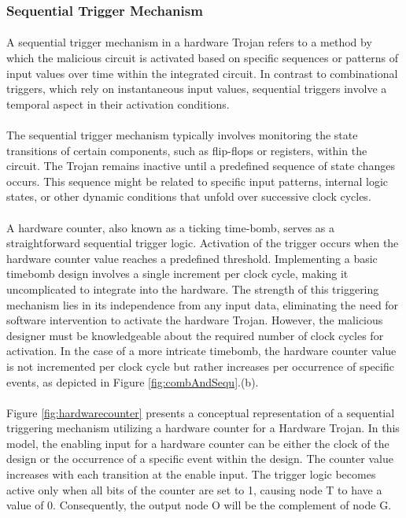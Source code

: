\subsubsection{Sequential Trigger Mechanism}
\paragraph*{}
A sequential trigger mechanism in a hardware Trojan refers to a method by which the malicious circuit is activated based on specific sequences or patterns of input values over time within the integrated circuit. In contrast to combinational triggers, which rely on instantaneous input values, sequential triggers involve a temporal aspect in their activation conditions.
\paragraph*{}
The sequential trigger mechanism typically involves monitoring the state transitions of certain components, such as flip-flops or registers, within the circuit. The Trojan remains inactive until a predefined sequence of state changes occurs. This sequence might be related to specific input patterns, internal logic states, or other dynamic conditions that unfold over successive clock cycles.
\paragraph*{}
A hardware counter, also known as a ticking time-bomb, serves as a straightforward sequential trigger logic. Activation of the trigger occurs when the hardware counter value reaches a predefined threshold. Implementing a basic timebomb design involves a single increment per clock cycle, making it uncomplicated to integrate into the hardware. The strength of this triggering mechanism lies in its independence from any input data, eliminating the need for software intervention to activate the hardware Trojan. However, the malicious designer must be knowledgeable about the required number of clock cycles for activation. In the case of a more intricate timebomb, the hardware counter value is not incremented per clock cycle but rather increases per occurrence of specific events, as depicted in Figure \ref*{fig:combAndSequ}.(b).
\paragraph*{}
Figure \ref{fig:hardwarecounter} presents a conceptual representation of a sequential triggering mechanism utilizing a hardware counter for a Hardware Trojan. In this model, the enabling input for a hardware counter can be either the clock of the design or the occurrence of a specific event within the design. The counter value increases with each transition at the enable input. The trigger logic becomes active only when all bits of the counter are set to 1, causing node T to have a value of 0. Consequently, the output node O will be the complement of node G.
